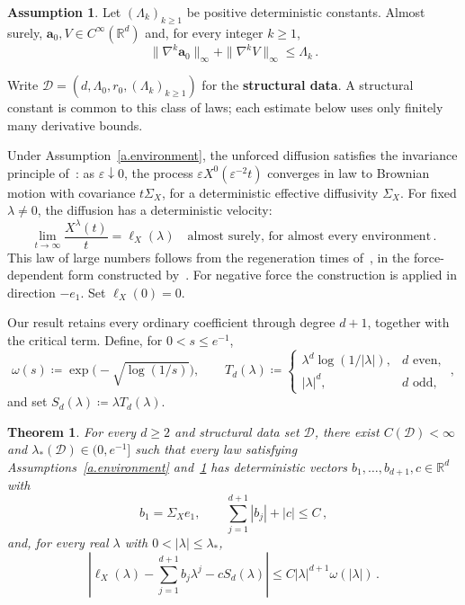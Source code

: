 \documentclass[11pt]{amsart}
\newtheorem{theorem}[proposition]{Theorem}
\theoremstyle{definition}
\newtheorem{assumption}{Assumption}[section]
\theoremstyle{remark}
\numberwithin{equation}{section}
\newcommand{\R}{\mathbb R}
\renewcommand{\a}{\mathbf a}
\renewcommand{\epsilon}{\varepsilon}
\begin{document}
\begin{assumption}\label{a.smooth}
Let $(\Lambda_k)_{k\geq1}$ be positive deterministic constants. Almost surely, $\a_0,V\in C^\infty(\R^d)$ and, for every integer $k\geq1$,
\begin{equation}\label{e:smooth-hypothesis}
 \|\nabla^k\a_0\|_\infty+\|\nabla^kV\|_\infty\leq\Lambda_k\, .
\end{equation}
\end{assumption}

Write $\mathcal D=(d,\Lambda_0,r_0,(\Lambda_k)_{k\geq1})$ for the \textbf{structural data}. A structural constant is common to this class of laws; each estimate below uses only finitely many derivative bounds.

Under Assumption~\ref{a.environment}, the unforced diffusion satisfies the invariance principle of~\citet*{DeMasiFerrariGoldsteinWick1989}: as $\epsilon\downarrow0$, the process $\epsilon X^0(\epsilon^{-2}t)$ converges in law to Brownian motion with covariance $t\Sigma_X$, for a deterministic effective diffusivity $\Sigma_X$. For fixed $\lambda\neq0$, the diffusion has a deterministic velocity:
\begin{equation}\label{eq.velocity-definition}
 \lim_{t\to\infty}\frac{X^\lambda(t)}t=\ell_X(\lambda)
 \quad\text{almost surely, for almost every environment}\, .
\end{equation}
This law of large numbers follows from the regeneration times of~\citet*{ballistic2003shen,ballistic2004shen}, in the force-dependent form constructed by~\citet[Section~5]{Einstein2012gantert}. For negative force the construction is applied in direction $-e_1$. Set $\ell_X(0)=0$.

Our result retains every ordinary coefficient through degree $d+1$, together with the critical term. Define, for $0<s\leq e^{-1}$,
\begin{equation*}
 \omega(s)\coloneqq\exp\bigl(-\sqrt{\log(1/s)}\bigr),\qquad
 T_d(\lambda)\coloneqq\begin{cases}
 \lambda^d\log(1/|\lambda|),&d\text{ even},\\
 |\lambda|^d,&d\text{ odd},
 \end{cases}\, ,
\end{equation*}
and set $S_d(\lambda)\coloneqq\lambda T_d(\lambda)$.

\begin{theorem}\label{t:expansion}
For every $d\geq2$ and structural data set $\mathcal D$, there exist $C(\mathcal D)<\infty$ and $\lambda_*(\mathcal D)\in(0,e^{-1}]$ such that every law satisfying Assumptions~\ref{a.environment} and~\ref{a.smooth} has deterministic vectors $b_1,\ldots,b_{d+1},c\in\R^d$ with
\begin{equation}\label{e:coefficient-bounds}
 b_1=\Sigma_Xe_1,\qquad \sum_{j=1}^{d+1}|b_j|+|c|\leq C\, ,
\end{equation}
and, for every real $\lambda$ with $0<|\lambda|\leq\lambda_*$,
\begin{equation}\label{e:expansion}
 \left|\ell_X(\lambda)-\sum_{j=1}^{d+1}b_j\lambda^j-cS_d(\lambda)\right|
 \leq C|\lambda|^{d+1}\omega(|\lambda|)\, .
\end{equation}
\end{theorem}
\end{document}
